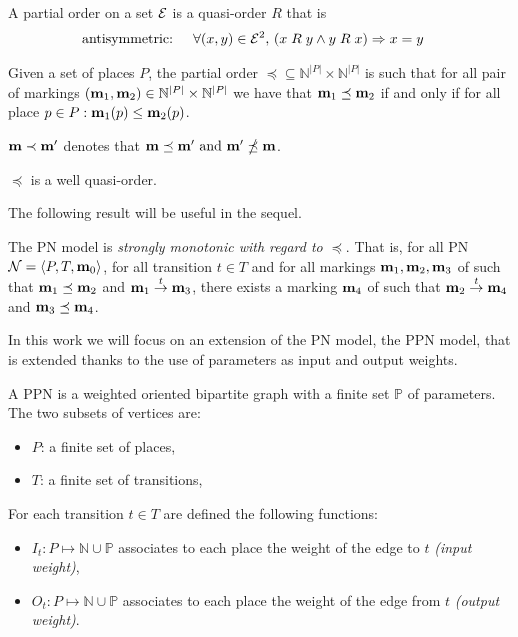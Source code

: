 \begin{defi}
  A partial order on a set $\mathcal{E}$ is a quasi-order $R$ that is
  \begin{align*}
    \text{antisymmetric: } &&\forall (x, y) \in \mathcal{E}^2,\ & (x \mathrel{R} y\land y \mathrel{R} x)\Rightarrow x = y
  \end{align*}
\end{defi}

\begin{defi}
  Given a set of places $P$, the partial order \(\preceq \subseteq \mathbb{N}^{|P|} \times \mathbb{N}^{|P|}\) is such that for all pair of markings \((\mathbf{m}_1, \mathbf{m}_2) \in \mathbb{N}^{|P|} \times \mathbb{N}^{|P|}\) we have that \(\mathbf{m}_1 \preceq \mathbf{m}_2\) if and only if for all place \(p \in P : \mathbf{m}_1(p) \leq \mathbf{m}_2(p)\).
\end{defi}

\(\mathbf{m} \prec \mathbf{m'}\) denotes that \(\mathbf{m} \preceq \mathbf{m'} \text{ and } \mathbf{m'} \npreceq \mathbf{m}\).

\begin{lemm}
  \label{lemm:wqo}
  $\preceq$ is a well quasi-order.
\end{lemm}

The following result will be useful in the sequel.

\begin{lemm}
  The \ac{PN} model is \emph{strongly monotonic with regard to $\preceq$}. That is, for all \ac{PN} $\mathcal{N} = \langle P,T, \mathbf{m}_0\rangle$, for all transition $t \in T$ and for all markings $\mathbf{m}_1, \mathbf{m}_2, \mathbf{m}_3$ of \N such that $\mathbf{m}_1 \preceq \mathbf{m}_2$ and $\mathbf{m}_1 \stackrel{t}{\to} \mathbf{m}_3$, there exists a marking $\mathbf{m}_4$ of \N such that $\mathbf{m}_2 \stackrel{t}{\to} \mathbf{m}_4$ and $\mathbf{m}_3 \preceq \mathbf{m}_4$.
\end{lemm}

In this work we will focus on an extension of the \ac{PN} model, the \ac{PPN} model, that is extended thanks to the use of parameters as input and output weights.

\begin{defi}
  A \acf{PPN} \SPTP is a weighted oriented bipartite graph with a finite set $\mathbb{P}$ of parameters. The two subsets of vertices are:
  \begin{itemize}
    \item $P$: a finite set of places,
    \item $T$: a finite set of transitions,
  \end{itemize}
  For each transition $t \in T$ are defined the following functions:
  \begin{itemize}
    \item $I_t : P \mapsto \mathbb{N} \cup \mathbb{P}$ associates to each place the weight of the edge to $t$ \emph{(input weight)},
    \item $O_t : P \mapsto \mathbb{N} \cup \mathbb{P}$ associates to each place the weight of the edge from $t$ \emph{(output weight)}.
  \end{itemize}
\end{defi}

